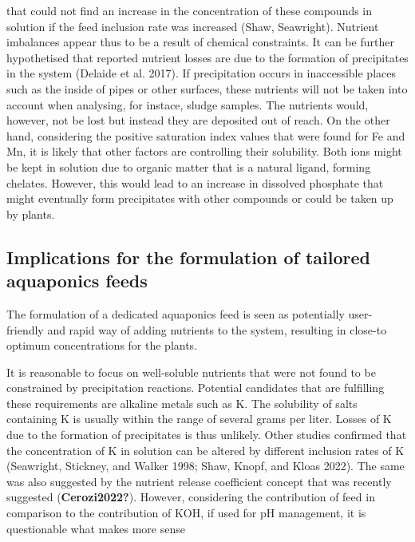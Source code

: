 \documentclass[
]{article}
\begin{document}
that could not find an increase in the concentration of these compounds in solution if the feed inclusion rate was increased (Shaw, Seawright). Nutrient imbalances appear thus to be a result of chemical constraints. It can be further hypothetised that reported nutrient losses are due to the formation of precipitates in the system (Delaide et al. 2017). If precipitation occurs in inaccessible places such as the inside of pipes or other surfaces, these nutrients will not be taken into account when analysing, for instace, sludge samples. The nutrients would, however, not be lost but instead they are deposited out of reach.
On the other hand, considering the positive saturation index values that were found for Fe and Mn, it is likely that other factors are controlling their solubility. Both ions might be kept in solution due to organic matter that is a natural ligand, forming chelates. However, this would lead to an increase in dissolved phosphate that might eventually form precipitates with other compounds or could be taken up by plants.

\hypertarget{implications-for-the-formulation-of-tailored-aquaponics-feeds}{%
\subsection{Implications for the formulation of tailored aquaponics feeds}\label{implications-for-the-formulation-of-tailored-aquaponics-feeds}}

The formulation of a dedicated aquaponics feed is seen as potentially user-friendly and rapid way of adding nutrients to the system, resulting in close-to optimum concentrations for the plants.

It is reasonable to focus on well-soluble nutrients that were not found to be constrained by precipitation reactions. Potential candidates that are fulfilling these requirements are alkaline metals such as K. The solubility of salts containing K is usually within the range of several grams per liter. Losses of K due to the formation of precipitates is thus unlikely. Other studies confirmed that the concentration of K in solution can be altered by different inclusion rates of K (Seawright, Stickney, and Walker 1998; Shaw, Knopf, and Kloas 2022). The same was also suggested by the nutrient release coefficient concept that was recently suggested (\textbf{Cerozi2022?}).
However, considering the contribution of feed in comparison to the contribution of KOH, if used for pH management, it is questionable what makes more sense
\end{document}
